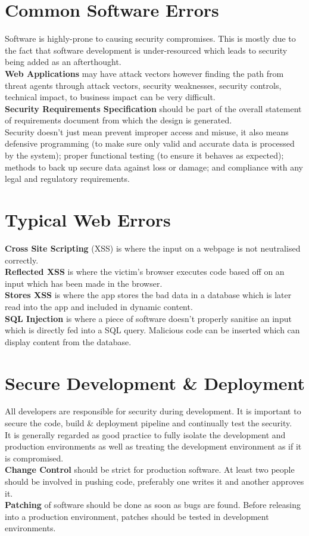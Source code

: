 \documentclass[a4paper,11pt]{article}
\begin{document}
\section{Common Software Errors}
Software is highly-prone to causing security compromises. This is mostly due to the fact that software development is under-resourced which leads to security being added as an afterthought.\\
\textbf{Web Applications} may have attack vectors however finding the path from threat agents through attack vectors, security weaknesses, security controls, technical impact, to business impact can be very difficult.\\
\textbf{Security Requirements Specification} should be part of the overall statement of requirements document from which the design is generated.\\
Security doesn't just mean prevent improper access and misuse, it also means defensive programming (to make sure only valid and accurate data is processed by the system); proper functional testing (to ensure it behaves as expected); methods to back up secure data against loss or damage; and compliance with any legal and regulatory requirements.

\section{Typical Web Errors}
\textbf{Cross Site Scripting} (XSS) is where the input on a webpage is not neutralised correctly.\\
\textbf{Reflected XSS} is where the victim's browser executes code based off on an input which has been made in the browser.\\
\textbf{Stores XSS} is where the app stores the bad data in a database which is later read into the app and included in dynamic content.\\
\textbf{SQL Injection} is where a piece of software doesn't properly sanitise an input which is directly fed into a SQL query. Malicious code can be inserted which can display content from the database.

\section{Secure Development \& Deployment}
All developers are responsible for security during development. It is important to secure the code, build \& deployment pipeline and continually test the security.\\
It is generally regarded as good practice to fully isolate the development and production environments as well as treating the development environment as if it is compromised.\\
\textbf{Change Control} should be strict for production software. At least two people should be involved in pushing code, preferably one writes it and another approves it.\\
\textbf{Patching} of software should be done as soon as bugs are found. Before releasing into a production environment, patches should be tested in development environments.
\end{document}
